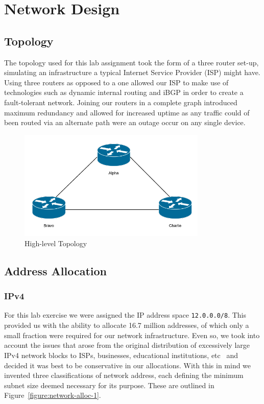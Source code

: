 \chapter{Network Design}

\section{Topology}

The topology used for this lab assignment took the form of a three router set-up, 
simulating an infrastructure a typical Internet Service Provider (ISP)
might have. Using three routers as opposed to a one allowed our ISP to make
use of technologies such as dynamic internal routing and iBGP in order to
create a fault-tolerant network. Joining our routers in a complete graph
introduced maximum redundancy and allowed for increased uptime as any traffic
could of been routed via an alternate path were an outage occur on any single
device.

\begin{figure}[!ht]
    \caption{High-level Topology}
    \centering
    \includegraphics[width=0.8\textwidth]{images/networkTopology.png}
\end{figure}

\section{Address Allocation}
\subsection{IPv4}
For this lab exercise we were assigned the IP address space
\texttt{12.0.0.0/8}. This provided us with the ability to allocate 16.7 million
addresses, of which only a small fraction were required for our network
infrastructure. Even so, we took into account the issues that arose from the
original distribution of excessively large IPv4 network blocks to ISPs,
businesses, educational institutions, etc~\cite{ipv4alloc}\cite{internetmap}
and decided it was best to be conservative in our allocations. With this in
mind we invented three classifications of network address, each defining the
minimum subnet size deemed necessary for its purpose. These are outlined in
Figure~\ref{figure:network-alloc-1}.

